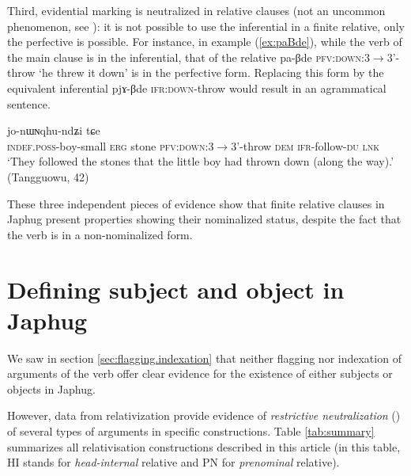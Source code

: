 \documentclass[oldfontcommands,oneside,a4paper,11pt]{article}
\newcommand{\ipa}[1]{{\phon #1}} %
\newcommand{\refb}[1]{(\ref{#1})}
\begin{document}
Third, evidential marking is neutralized in relative clauses (not an uncommon phenomenon, see \citealt[253-6]{aikhenvald06}): it is not possible to use the inferential in a finite relative, only the perfective is possible. For instance, in example \refb{ex:paBde}, while the verb of the main clause is in the inferential, that of the relative \ipa{pa-βde} \textsc{pfv:down}:3$\rightarrow$3'-throw `he threw it down' is in the perfective form. Replacing this form  by the equivalent inferential \ipa{pjɤ-βde}  \textsc{ifr:down}-throw would result in an agrammatical sentence.

\begin{exe}
\ex  \label{ex:paBde}
\gll  [\ipa{tɤ-tɕɯ-pɯ} 	\ipa{kɯ} 	\ipa{rdɤstaʁ} 	\ipa{pa-βde}] 	\ipa{nɯ} 	\ipa{jo-nɯɴqhu-ndʑi} \ipa{tɕe} \\
\textsc{indef.poss}-boy-small \textsc{erg} stone \textsc{pfv:down}:3$\rightarrow$3'-throw \textsc{dem} \textsc{ifr}-follow-\textsc{du} \textsc{lnk} \\
\glt `They followed the stones that the little boy had thrown down (along the way).' (Tangguowu, 42)
\end{exe}

These three independent pieces of evidence show that finite relative clauses in Japhug present properties showing their nominalized status, despite the fact that the verb is in a non-nominalized form.

\section{Defining subject and object in Japhug} \label{sec:subject.object}
We saw in section \ref{sec:flagging.indexation} that neither flagging nor indexation of arguments of the verb offer clear evidence for  the existence of either subjects or objects in Japhug.



However, data from relativization provide evidence of \textit{restrictive neutralization} (\citealt[275]{vanvalin97syntax}) of several types of arguments in specific constructions. Table \ref{tab:summary} summarizes all relativisation constructions described in this article (in this table, HI stands for \textit{head-internal} relative and PN for \textit{prenominal} relative).
\end{document}
